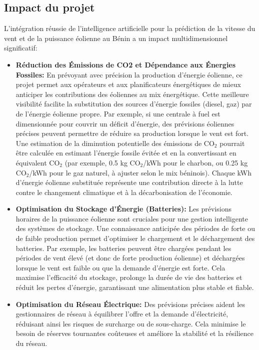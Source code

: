 \documentclass[12pt]{article}
\begin{document}
\subsection{Impact du projet}
L'intégration réussie de l'intelligence artificielle pour la prédiction de la vitesse du vent et de la puissance éolienne au Bénin a un impact multidimensionnel significatif:
\begin{itemize}[label=$\color{blue}\bigstar$]
	\item \textbf{\color{blue}Réduction des Émissions de CO2 et Dépendance aux Énergies Fossiles:} En prévoyant avec précision la production d'énergie éolienne, ce projet permet aux opérateurs et aux planificateurs énergétiques de mieux anticiper les contributions des éoliennes au mix énergétique. Cette meilleure visibilité facilite la substitution des sources d'énergie fossiles (diesel, gaz) par de l'énergie éolienne propre. Par exemple, si une centrale à fuel est dimensionnée pour couvrir un déficit d'énergie, des prévisions éoliennes précises peuvent permettre de réduire sa production lorsque le vent est fort. Une estimation de la diminution potentielle des émissions de CO$_2$ pourrait être calculée en estimant l'énergie fossile évitée et en la convertissant en équivalent CO$_2$ (par exemple, 0.5 kg CO$_2$/kWh pour le charbon, ou 0.25 kg CO$_2$/kWh pour le gaz naturel, à ajuster selon le mix béninois). Chaque kWh d'énergie éolienne substituée représente une contribution directe à la lutte contre le changement climatique et à la décarbonisation de l'économie.
	\item \textbf{\color{blue} Optimisation du Stockage d'Énergie (Batteries):} Les prévisions horaires de la puissance éolienne sont cruciales pour une gestion intelligente des systèmes de stockage. Une connaissance anticipée des périodes de forte ou de faible production permet d'optimiser le chargement et le déchargement des batteries. Par exemple, les batteries peuvent être chargées pendant les périodes de vent élevé (et donc de forte production éolienne) et déchargées lorsque le vent est faible ou que la demande d'énergie est forte. Cela maximise l'efficacité du stockage, prolonge la durée de vie des batteries et réduit les pertes d'énergie, garantissant une alimentation plus stable et fiable.
	\item \textbf{\color{blue} Optimisation du Réseau Électrique:} Des prévisions précises aident les gestionnaires de réseau à équilibrer l'offre et la demande d'électricité, réduisant ainsi les risques de surcharge ou de sous-charge. Cela minimise le besoin de réserves tournantes coûteuses et améliore la stabilité et la résilience du réseau.

\end{itemize}
\end{document}
